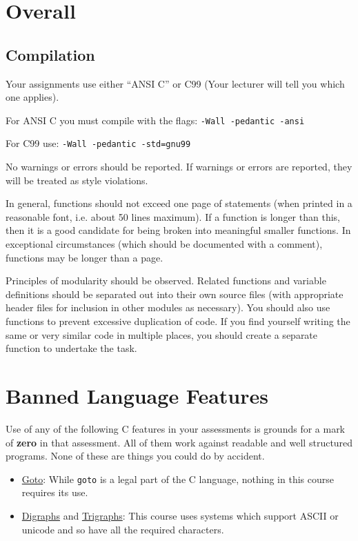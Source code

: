\documentclass{article}
\begin{document}
\section{Overall}
\subsection{Compilation}
Your assignments use either ``ANSI C'' or C99 (Your lecturer will tell you which one applies).

For ANSI C you must compile with the flags: \texttt{-Wall -pedantic -ansi}

For C99 use: \texttt{-Wall -pedantic -std=gnu99}

No warnings or errors should be reported.
If warnings or errors are reported, they will be treated as style violations.

In general, functions should not exceed one page of statements (when printed in a reasonable font, i.e. about 50 lines maximum).
If a function is longer than this, then it is a good candidate for being broken into meaningful smaller functions.
In exceptional circumstances (which should be documented with a comment), functions may be longer than a page.

Principles of modularity should be observed.
Related functions and variable definitions should be separated out into their own source files (with appropriate header files for inclusion in other modules as necessary).
You should also use functions to prevent excessive duplication of code.
If you find yourself writing the same or very similar code in multiple places, you should create a separate function to undertake the task.

\section{Banned Language Features}
Use of any of the following C features in your assessments is grounds for a mark of \textbf{zero} in that assessment.
All of them work against readable and well structured programs.
None of these are things you could do by accident.

\begin{itemize}
\item \underline{Goto}: While \texttt{goto} is a legal part of the C language, nothing in this course requires its use.
\item \underline{Digraphs} and \underline{Trigraphs}: This course uses systems which support ASCII or unicode and so have all the required characters.
\end{itemize}
\end{document}
